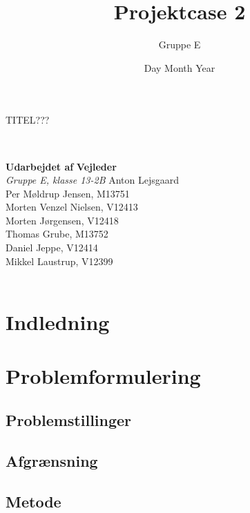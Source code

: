 \documentclass[12pt,a4paper]{report}
\title{Projektcase 2}
\author{Gruppe E}
\date{Day Month Year} %
\begin{document}
\pagestyle{empty}
\maketitle
\centering
\begin{huge}
TITEL???
\end{huge}\\
\vspace*{3\baselineskip}
\raggedright {\textbf{Udarbejdet af}} \hfill {\textbf{Vejleder}\\
\textit{Gruppe E, klasse 13-2B} \hfill Anton Lejsgaard\\
Per Møldrup Jensen, M13751\\
Morten Venzel Nielsen, V12413\\
Morten Jørgensen, V12418\\
Thomas Grube, M13752\\
Daniel Jeppe, V12414\\
Mikkel Laustrup, V12399}\\
\vfill
{}\\
\raggedright %
\newpage
\section{Indledning}
\tableofcontents
\newpage
\pagestyle{fancy}
\section{Problemformulering}
\subsection{Problemstillinger}
\subsection{Afgrænsning}
\subsection{Metode}



\end{document}
